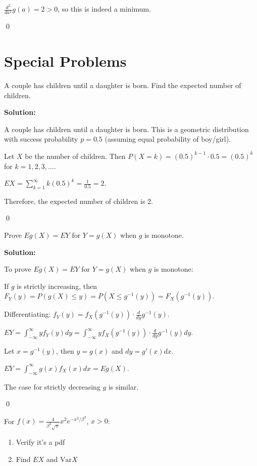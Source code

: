 $\frac{d^2}{da^2}g(a) = 2 > 0$, so this is indeed a minimum.


\qed
\section{Special Problems}

\begin{problembox}
A couple has children until a daughter is born. Find the expected number of children.
\end{problembox}

\noindent\textbf{Solution:}

A couple has children until a daughter is born. This is a geometric distribution with success probability $p = 0.5$ (assuming equal probability of boy/girl).

Let $X$ be the number of children. Then $P(X = k) = (0.5)^{k-1} \cdot 0.5 = (0.5)^k$ for $k = 1, 2, 3, \ldots$.

$EX = \sum_{k=1}^\infty k(0.5)^k = \frac{1}{0.5} = 2$.

Therefore, the expected number of children is 2.


\qed
\begin{problembox}
Prove $Eg(X)=EY$ for $Y=g(X)$ when $g$ is monotone.
\end{problembox}

\noindent\textbf{Solution:}

To prove $Eg(X)=EY$ for $Y=g(X)$ when $g$ is monotone:

If $g$ is strictly increasing, then $F_Y(y) = P(g(X) \leq y) = P(X \leq g^{-1}(y)) = F_X(g^{-1}(y))$.

Differentiating: $f_Y(y) = f_X(g^{-1}(y)) \cdot \frac{d}{dy}g^{-1}(y)$.

$EY = \int_{-\infty}^{\infty} y f_Y(y)dy = \int_{-\infty}^{\infty} y f_X(g^{-1}(y)) \cdot \frac{d}{dy}g^{-1}(y)dy$.

Let $x = g^{-1}(y)$, then $y = g(x)$ and $dy = g'(x)dx$.

$EY = \int_{-\infty}^{\infty} g(x) f_X(x)dx = Eg(X)$.

The case for strictly decreasing $g$ is similar.


\qed
\begin{problembox}
For $f(x)=\frac{4}{\beta^3\sqrt{\pi}}x^2e^{-x^2/\beta^2}$, $x>0$:
\begin{enumerate}[label=(\alph*)]
    \item Verify it's a pdf
    \item Find $EX$ and $\text{Var}X$
\end{enumerate}
\end{problembox}

